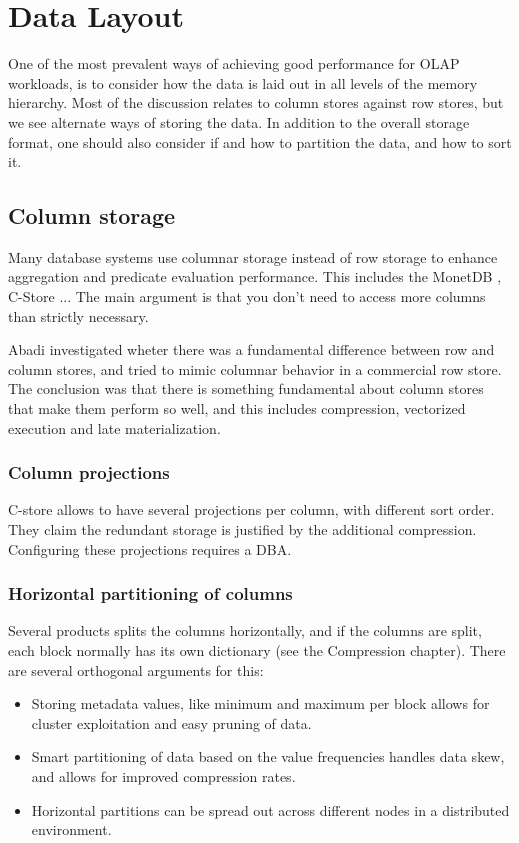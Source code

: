 \chapter{Data Layout}
\label{chap:Data Layout}
One of the most prevalent ways of achieving good performance for OLAP workloads, is to consider how the data is laid out in all levels of the memory hierarchy. Most of the discussion relates to column stores against row stores, but we see alternate ways of storing the data. In addition to the overall storage format, one should also consider if and how to partition the data, and how to sort it.
\newpage

\section{Column storage}
\label{sec:Column storage}
Many database systems use columnar storage instead of row storage to enhance aggregation and predicate evaluation performance. This includes the MonetDB \cite{a}, C-Store \cite{b}... The main argument is that you don't need to access more columns than strictly necessary.

Abadi \ea \cite{Abadi2008-dd} investigated wheter there was a fundamental difference between row and column stores, and tried to mimic columnar behavior in a commercial row store. The conclusion was that there is something fundamental about column stores that make them perform so well, and this includes compression, vectorized execution and late materialization.

\subsection{Column projections}
\label{sub:Column projections}
C-store allows to have several projections per column, with different sort order. They claim the redundant storage is justified by the additional compression. Configuring these projections requires a DBA.

\subsection{Horizontal partitioning of columns}
\label{sub:Horizontal partitioning of columns}
Several products splits the columns horizontally, and if the columns are split, each block normally has its own dictionary (see the Compression chapter). There are several orthogonal arguments for this:
\begin{itemize}
  \item Storing metadata values, like minimum and maximum per block allows for cluster exploitation and easy pruning of data.
  \item Smart partitioning of data based on the value frequencies handles data skew, and allows for improved compression rates.
  \item Horizontal partitions can be spread out across different nodes in a distributed environment.
\end{itemize}


